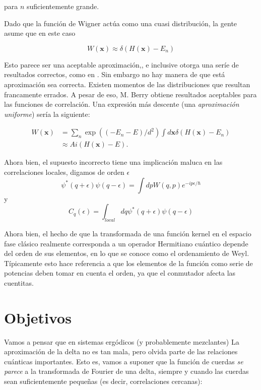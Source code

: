 \documentclass[a4paper,10pt]{article}
\newcommand{\xfase}{\mathbf{x}}
\begin{document}
para $n$ suficientemente grande. 

Dado que la función de Wigner actúa como una cuasi distribución,
la gente asume que en este caso 

\begin{equation}
W(\xfase)\approx \delta(H(\xfase)-E_n)
\end{equation}

Esto parece ser una aceptable aproximación,, e inclusive otorga 
una seríe de resultados correctos, como en \cite{Berry78}.
Sin embargo no hay manera de que está aproximación sea correcta.
Existen momentos de las distribuciones que resultan 
francamente errados. A pesar de eso, M. Berry obtiene resultados 
aceptables para las funciones de correlación.
Una expresión más descente (una \emph{aproximación uniforme}) sería
la siguiente:

\begin{equation}
\begin{split}
W(\xfase)&=\sum_n \exp((-E_n -E)/d^2) \int d\xfase \delta(H(\xfase)-E_n)\\
&\approx Ai(H(\xfase)-E).
\end{split}
\end{equation}

Ahora bien, el supuesto incorrecto tiene una implicación maluca
en las correlaciones locales, digamos de orden $\epsilon$
\begin{equation}
\psi^*(q+\epsilon)\psi(q-\epsilon)=\int dp W(q,p)e^{-ip\epsilon/\hbar}
\end{equation}
y
\begin{equation}
C_q(\epsilon)=\int_{local} dq \psi^*(q+\epsilon)\psi(q-\epsilon)
\end{equation}

Ahora bien, el hecho de que la transformada de una función kernel
en el espacio fase clásico realmente corresponda a un
operador Hermitiano cuántico depende del orden de sus
elementos, en lo que se conoce como el ordenamiento de Weyl.
Típicamente esto hace referencia a que los elementos de la
función como serie de potencias deben tomar en cuenta el orden, ya 
que el conmutador afecta las cuentitas.


\section{Objetivos}

Vamos a pensar que en sistemas ergódicos (y probablemente mezclantes)
La aproximación de la delta no es tan mala, pero olvida parte
de las relaciones cuánticas importantes. Esto es, vamos a suponer
que la función de cuerdas \emph{se parece} a la transformada de
Fourier de una delta, siempre y cuando las cuerdas sean suficientemente
pequeñas (es decir, correlaciones cercanas):
\end{document}
